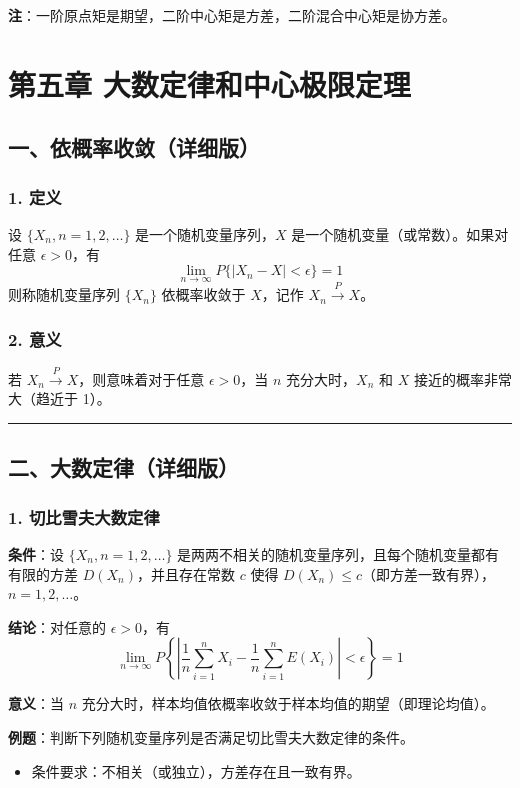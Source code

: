 \documentclass[12pt,a4paper]{ctexart}
\begin{document}
\textbf{注}：一阶原点矩是期望，二阶中心矩是方差，二阶混合中心矩是协方差。

\newpage
\section{第五章 大数定律和中心极限定理}

\subsection{一、依概率收敛（详细版）}

\subsubsection{1. 定义}
设 $\{X_n, n = 1, 2, \dots\}$ 是一个随机变量序列，$X$ 是一个随机变量（或常数）。如果对任意 $\epsilon > 0$，有
\[ \lim_{n \to \infty} P\{|X_n - X| < \epsilon\} = 1 \]
则称随机变量序列 $\{X_n\}$ 依概率收敛于 $X$，记作 $X_n \xrightarrow{P} X$。

\subsubsection{2. 意义}
若 $X_n \xrightarrow{P} X$，则意味着对于任意 $\epsilon > 0$，当 $n$ 充分大时，$X_n$ 和 $X$ 接近的概率非常大（趋近于 1）。

\vspace{1em}\hrule\vspace{1em}

\subsection{二、大数定律（详细版）}

\subsubsection{1. 切比雪夫大数定律}
\textbf{条件}：设 $\{X_n, n = 1, 2, \dots\}$ 是两两不相关的随机变量序列，且每个随机变量都有有限的方差 $D(X_n)$，并且存在常数 $c$ 使得 $D(X_n) \le c$（即方差一致有界），$n = 1, 2, \dots$。

\textbf{结论}：对任意的 $\epsilon > 0$，有
\[ \lim_{n \to \infty} P\left\{\left|\frac{1}{n} \sum_{i=1}^n X_i - \frac{1}{n} \sum_{i=1}^n E(X_i)\right| < \epsilon\right\} = 1 \]

\textbf{意义}：当 $n$ 充分大时，样本均值依概率收敛于样本均值的期望（即理论均值）。

\textbf{例题}：判断下列随机变量序列是否满足切比雪夫大数定律的条件。
\begin{itemize}[noitemsep]
    \item 条件要求：不相关（或独立），方差存在且一致有界。
\end{itemize}
\end{document}
